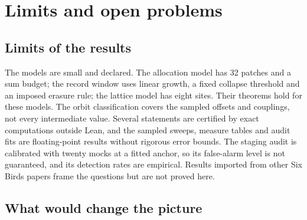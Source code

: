 \hypertarget{limits-and-open-problems}{%
\section{Limits and open problems}\label{limits-and-open-problems}}

\hypertarget{limits-of-the-results}{%
\subsection{Limits of the results}\label{limits-of-the-results}}

The models are small and declared. The allocation model has 32 patches
and a sum budget; the record window uses linear growth, a fixed collapse
threshold and an imposed erasure rule; the lattice model has eight
sites. Their theorems hold for these models. The orbit classification
covers the sampled offsets and couplings, not every intermediate value.
Several statements are certified by exact computations outside Lean, and
the sampled sweeps, measure tables and audit fits are floating-point
results without rigorous error bounds. The staging audit is calibrated
with twenty mocks at a fitted anchor, so its false-alarm level is not
guaranteed, and its detection rates are empirical. Results imported from
other Six Birds papers frame the questions but are not proved here.

\hypertarget{what-would-change-the-picture}{%
\subsection{What would change the
picture}\label{what-would-change-the-picture}}

